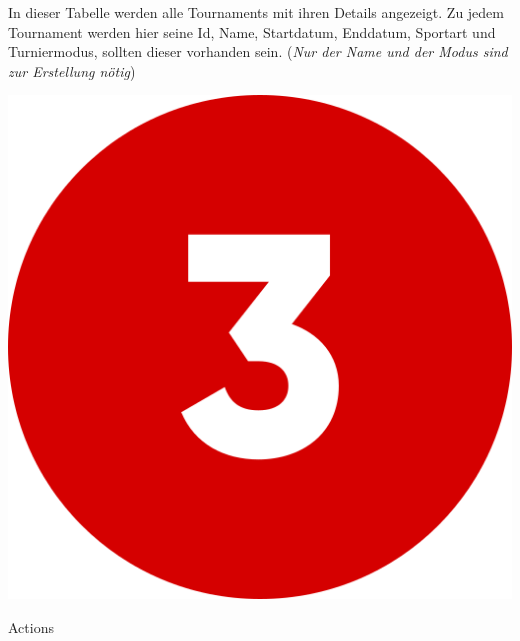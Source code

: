In dieser Tabelle werden alle Tournaments mit ihren Details angezeigt. Zu jedem Tournament werden hier seine Id, Name, Startdatum, Enddatum, Sportart
und Turniermodus, sollten dieser vorhanden sein. (\textit{Nur der Name und der Modus sind zur Erstellung nötig})


\bigskip
\includegraphics[scale=0.05]{pics/user-guide/numbers/number-3.png} \begin{LARGE} Actions \end{LARGE}

